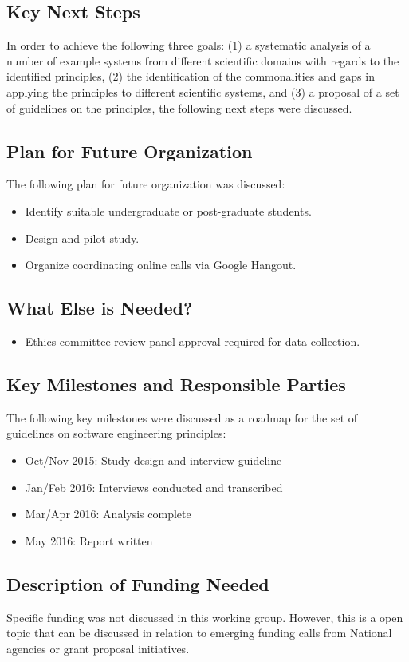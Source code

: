 \subsection{Key Next Steps}

In order to achieve the following three goals: (1) a systematic analysis of a number of example systems from
different scientific domains with regards to the identified principles, (2) the
identification of the commonalities and gaps in applying the principles to different
scientific systems, and (3) a proposal of a set of guidelines on the
principles, the following next steps were discussed.

\subsection{Plan for Future Organization}

The following plan for future organization was discussed:
\begin{itemize}
\item Identify suitable undergraduate or post-graduate students.
\item Design and pilot study.
\item Organize coordinating online calls via Google Hangout.
\end{itemize}

\subsection{What Else is Needed?}

\begin{itemize}
\item Ethics committee review panel approval required for data collection.
\end{itemize}

\subsection{Key Milestones and Responsible Parties}

The following key milestones were discussed as a roadmap for the set of
guidelines on software engineering principles:
\begin{itemize}
\item Oct/Nov 2015: Study design and interview guideline
\item Jan/Feb 2016: Interviews conducted and transcribed
\item Mar/Apr 2016: Analysis complete
\item May 2016: Report written
\end{itemize}

\subsection{Description of Funding Needed}

Specific funding was not discussed in this working group. However, this is a
open topic that can be discussed in relation to emerging funding calls from
National agencies or grant proposal initiatives.
